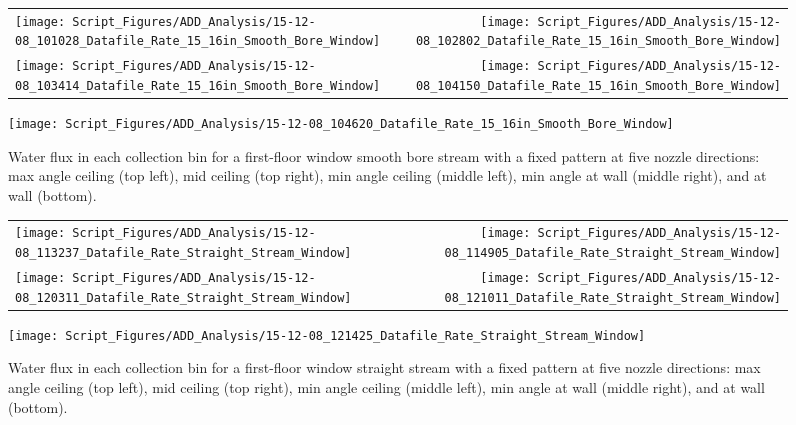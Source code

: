 \documentclass[12pt,oneside]{book}
\begin{document}
\begin{figure}[ht]
\begin{tabular*}{\textwidth}{lr}
\texttt{[image: Script\_Figures/ADD\_Analysis/15-12-08\_101028\_Datafile\_Rate\_15\_16in\_Smooth\_Bore\_Window]} &
\texttt{[image: Script\_Figures/ADD\_Analysis/15-12-08\_102802\_Datafile\_Rate\_15\_16in\_Smooth\_Bore\_Window]} \\
\texttt{[image: Script\_Figures/ADD\_Analysis/15-12-08\_103414\_Datafile\_Rate\_15\_16in\_Smooth\_Bore\_Window]} &
\texttt{[image: Script\_Figures/ADD\_Analysis/15-12-08\_104150\_Datafile\_Rate\_15\_16in\_Smooth\_Bore\_Window]} \\
\end{tabular*}
\centering
\texttt{[image: Script\_Figures/ADD\_Analysis/15-12-08\_104620\_Datafile\_Rate\_15\_16in\_Smooth\_Bore\_Window]} \\
\caption[Water Flux for Varying Nozzle Direction with Fixed First Floor Window Smooth Bore Stream]{Water flux in each collection bin for a first-floor window smooth bore stream with a fixed pattern at five nozzle directions: max angle ceiling (top left), mid ceiling (top right), min angle ceiling (middle left), min angle at wall (middle right), and at wall (bottom).}
\label{fig:Window_First_Floor_Varying_Nozzle_Directions_SB_Fixed_Pattern}
\end{figure}

\begin{figure}[ht]
\begin{tabular*}{\textwidth}{lr}
\texttt{[image: Script\_Figures/ADD\_Analysis/15-12-08\_113237\_Datafile\_Rate\_Straight\_Stream\_Window]} &
\texttt{[image: Script\_Figures/ADD\_Analysis/15-12-08\_114905\_Datafile\_Rate\_Straight\_Stream\_Window]} \\
\texttt{[image: Script\_Figures/ADD\_Analysis/15-12-08\_120311\_Datafile\_Rate\_Straight\_Stream\_Window]} &
\texttt{[image: Script\_Figures/ADD\_Analysis/15-12-08\_121011\_Datafile\_Rate\_Straight\_Stream\_Window]} \\
\end{tabular*}
\centering
\texttt{[image: Script\_Figures/ADD\_Analysis/15-12-08\_121425\_Datafile\_Rate\_Straight\_Stream\_Window]} \\
\caption[Water Flux for Varying Nozzle Direction with Fixed First Floor Window Straight Stream]{Water flux in each collection bin for a first-floor window straight stream with a fixed pattern at five nozzle directions: max angle ceiling (top left), mid ceiling (top right), min angle ceiling (middle left), min angle at wall (middle right), and at wall (bottom).}
\label{fig:Window_First_Floor_Varying_Nozzle_Directions_SS_Fixed_Pattern}
\end{figure}
\end{document}
